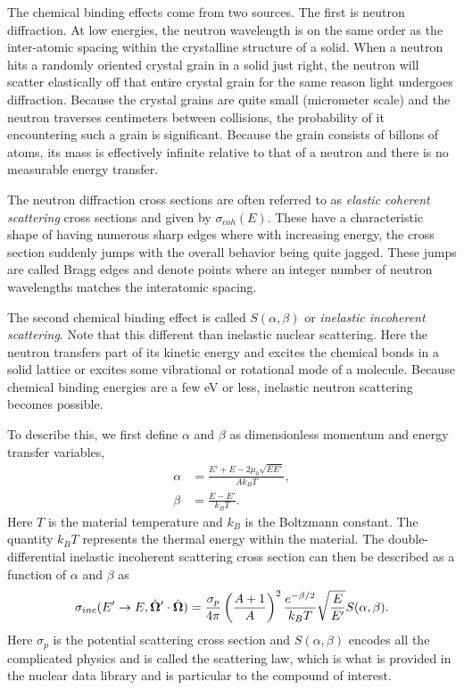 The chemical binding effects come from two sources. The first is neutron diffraction. At low energies, the neutron wavelength is on the same order as the inter-atomic spacing within the crystalline structure of a solid. When a neutron hits a randomly oriented crystal grain in a solid just right, the neutron will scatter elastically off that entire crystal grain for the same reason light undergoes diffraction. Because the crystal grains are quite small (micrometer scale) and the neutron traverses centimeters between collisions, the probability of it encountering such a grain is significant. Because the grain consists of billons of atoms, its mass is effectively infinite relative to that of a neutron and there is no measurable energy transfer.

The neutron diffraction cross sections are often referred to as \emph{elastic coherent scattering} cross sections and given by $\sigma_{coh}(E)$. These have a characteristic shape of having numerous sharp edges where with increasing energy, the cross section suddenly jumps with the overall behavior being quite jagged. These jumps are called Bragg edges and denote points where an integer number of neutron wavelengths matches the interatomic spacing.

The second chemical binding effect is called $S(\alpha,\beta)$ or \emph{inelastic incoherent scattering}. Note that this different than inelastic nuclear scattering. Here the neutron transfers part of its kinetic energy and excites the chemical bonds in a solid lattice or excites some vibrational or rotational mode of a molecule. Because chemical binding energies are a few eV or less, inelastic neutron scattering becomes possible.

To describe this, we first define $\alpha$ and $\beta$ as dimensionless momentum and energy transfer variables,
\begin{subequations}
\begin{align}
  \alpha &= \frac{ E' + E - 2 \mu_0 \sqrt{ E E' } }{ A k_B T }, \\
  \beta  &= \frac{ E - E' }{ k_B T } .
\end{align}
\end{subequations} 
Here $T$ is the material temperature and $k_B$ is the Boltzmann constant. The quantity $k_B T$ represents the thermal energy within the material. The double-differential inelastic incoherent scattering cross section can then be described as a function of $\alpha$ and $\beta$ as
\begin{align} \label{Eq:nuclearData_generalDDXS_Salphabeta}
  \sigma_{inc}(E' \rightarrow E, \hat{\mathbf{\Omega}}' \cdot \hat{\mathbf{\Omega}} ) = \frac{ \sigma_p }{ 4\pi } \left( \frac{ A + 1 }{ A } \right)^2 \frac{ e^{-\beta/2} }{ k_B T } \sqrt{\frac{E}{E'}} S(\alpha,\beta) .
\end{align}
Here $\sigma_p$ is the potential scattering cross section and $S(\alpha,\beta)$ encodes all the complicated physics and is called the scattering law, which is what is provided in the nuclear data library and is particular to the compound of interest. 

